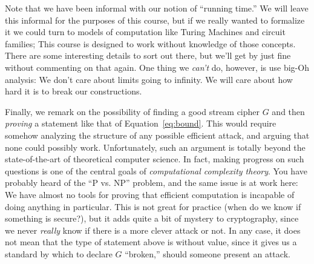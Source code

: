 \documentclass[11pt]{article}
\begin{document}
Note that we have been informal with our notion of ``running time.'' We will
leave this informal for the purposes of this course, but if we really wanted to
formalize it we could turn to models of computation like Turing Machines and
circuit families; This course is designed to work without knowledge of those
concepts.  There are some interesting details to sort out there, but we'll get
by just fine without commenting on that again.  One thing we \emph{can't} do,
however, is use big-Oh analysis: We don't care about limits going to infinity.
We will care about how hard it is to break our constructions.

Finally, we remark on the possibility of finding a good stream cipher $G$ and
then \emph{proving} a statement like that of Equation~\ref{eq:bound}. This
would require somehow analyzing the structure of any possible efficient attack,
and arguing that none could possibly work. Unfortunately, such an argument is
totally beyond the state-of-the-art of theoretical computer science. In fact,
making progress on such questions is one of the central goals of
\emph{computational complexity theory}. You have probably heard of the ``P vs.
NP'' problem, and the same issue is at work here: We have almost no tools for
proving that efficient computation is incapable of doing anything in
particular. This is not great for practice (when do we know if something is
secure?), but it adds quite a bit of mystery to cryptography, since we never
\emph{really} know if there is a more clever attack or not. In any case, it
does not mean that the type of statement above is without value, since it gives
us a standard by which to declare $G$ ``broken,'' should someone present an
attack.
\end{document}
